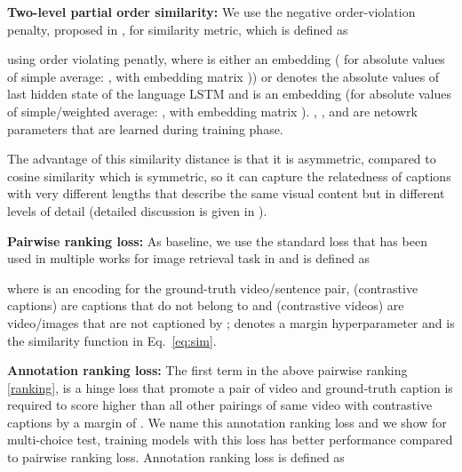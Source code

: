 \documentclass[runningheads]{llncs}
\begin{document}
{\bf Two-level partial order similarity:} 
We use the negative order-violation penalty, proposed in \cite{IvanVendrov2015}, for similarity metric, which is defined as    

using order violating penatly, where  is either an embedding ( for absolute values of simple average: , with embedding matrix )) or  
 denotes the absolute values of last hidden state of the language LSTM and  is an embedding (for absolute values of simple/weighted average: , with embedding matrix ). , , and  are netowrk parameters that are learned during training phase. 

The advantage of this similarity distance is that it is asymmetric, compared to cosine similarity which is symmetric, so it can capture the relatedness of captions with very different lengths that describe the same visual content but in different levels of detail (detailed discussion is given in \cite{IvanVendrov2015}). 

\noindent
{\bf Pairwise ranking loss:}
As baseline, we use the standard loss that has been used in multiple works for image retrieval task in \cite{kiros15tacl,IvanVendrov2015} and is defined as

where  is an encoding for the ground-truth video/sentence pair,  (contrastive captions) are captions that do not belong to  and  (contrastive videos) are video/images that are not captioned by ;  denotes a margin hyperparameter and  is the similarity function in Eq.~\ref{eq:sim}.

\noindent
{\bf Annotation ranking loss:}
The first term in the above pairwise ranking \ref{ranking}, is a hinge loss that promote a pair of  video and ground-truth caption is required to score higher than all other pairings of same video with contrastive captions by a margin of . We name this annotation ranking loss and we show for multi-choice test, training models with this loss has better performance compared to pairwise ranking loss. Annotation ranking loss is defined as  
\end{document}
